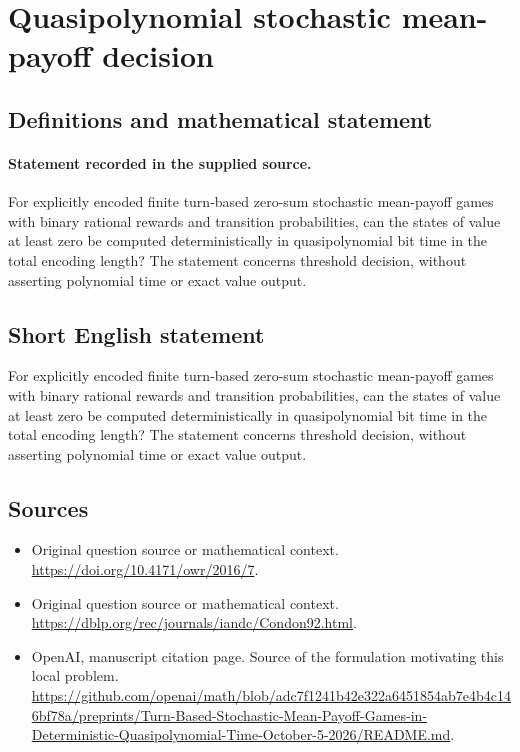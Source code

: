 \documentclass[11pt]{article}
\begin{document}
\section*{Quasipolynomial stochastic mean-payoff decision}\label{statement}
\subsection{Definitions and mathematical statement}
\paragraph{Statement recorded in the supplied source.}
For explicitly encoded finite turn-based zero-sum stochastic mean-payoff games with binary rational rewards and transition probabilities, can the states of value at least zero be computed deterministically in quasipolynomial bit time in the total encoding length? The statement concerns threshold decision, without asserting polynomial time or exact value output.
\subsection{Short English statement}
For explicitly encoded finite turn-based zero-sum stochastic mean-payoff games with binary rational rewards and transition probabilities, can the states of value at least zero be computed deterministically in quasipolynomial bit time in the total encoding length? The statement concerns threshold decision, without asserting polynomial time or exact value output.
\subsection{Sources}
\begin{itemize}
\item[S1] Original question source or mathematical context.
\url{https://doi.org/10.4171/owr/2016/7}.
\item[S2] Original question source or mathematical context.
\url{https://dblp.org/rec/journals/iandc/Condon92.html}.
\item[S3] OpenAI, manuscript citation page. Source of the formulation motivating this local problem.
\url{https://github.com/openai/math/blob/adc7f1241b42e322a6451854ab7e4b4c146bf78a/preprints/Turn-Based-Stochastic-Mean-Payoff-Games-in-Deterministic-Quasipolynomial-Time-October-5-2026/README.md}.
\end{itemize}
\end{document}
